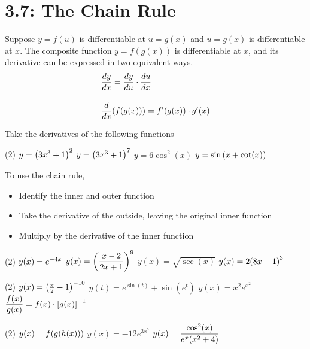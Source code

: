 \documentclass[../mathNotesPreamble]{subfiles}
\begin{document}
\section{3.7: The Chain Rule}

\begin{thmBox*}
  Suppose $y=f(u)$ is differentiable at $u=g(x)$ and $u=g(x)$ is differentiable at $x$. The composite function $y=f(g(x))$ is differentiable at $x$, and its derivative can be expressed in two equivalent ways.
    \begin{align}
      &\dfrac{dy}{dx} = \dfrac{dy}{du}\cdot \dfrac{du}{dx}\\[10pt]
      &\dfrac{d}{dx}\parens{f\parens{g(x)}}=f'\parens{g(x)}\cdot g'(x)
    \end{align}
\end{thmBox*}

\begin{ex*}
  Take the derivatives of the following functions
\end{ex*}
\begin{tasks}[after-item-skip=\stretch{1}](2)
  \task $y=\parens{3x^3+1}^2$
  \task $y=\parens{3x^3+1}^7$
  \task $y=6\cos^2(x)$
  \task $y=\sin\parens{x+\cot(x)}$
\end{tasks}
\pagebreak

\begin{thmBox*}
  To use the chain rule,
    \begin{itemize}
      \item Identify the inner and outer function
      \item Take the derivative of the outside, leaving the original inner function
      \item Multiply by the derivative of the inner function
    \end{itemize}
\end{thmBox*}

\begin{tasks}[resume, after-item-skip=\stretch{1}](2)
  \task $y(x)=e\inv[4x]$
  \task $y(x)=\parens{\dfrac{x-2}{2x+1}}^9$
  \task $y(x)=\sqrt{\sec(x)}$
  \task $y(x)=2\parens{8x-1}^3$
\end{tasks}
\pagebreak

\begin{tasks}[resume, after-item-skip=\stretch{1}](2)
  \task $y(x)=\parens{\frac{x}{2}-1}\inv[10]$
  \task $y(t)=e^{\sin(t)}+\sin(e^t)$
  \task $y(x)=x^2 e^{x^2}$
  \task $\dfrac{f(x)}{g(x)}=f(x)\cdot\sbrkt{g(x)}\inv$
\end{tasks}
\pagebreak

\begin{tasks}[resume, after-item-skip=\stretch{1}](2)
  \task $y(x)=f\parens{g\parens{h(x)}}$
  \task $y(x)=-12e^{3x^7}$
  \task* $y(x)=\dfrac{\cos^2(x)}{e^x\parens{x^2+4}}$
\end{tasks}
\pagebreak
\end{document}
